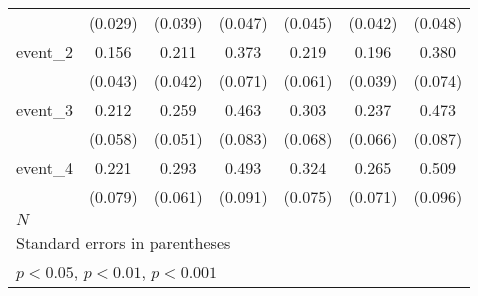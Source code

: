 {\begin{tabular}{l*{6}{c}}
            &     (0.029)         &     (0.039)         &     (0.047)         &     (0.045)         &     (0.042)         &     (0.048)         \\
[1em]
event\_2     &       0.156\sym{***}&       0.211\sym{***}&       0.373\sym{***}&       0.219\sym{***}&       0.196\sym{***}&       0.380\sym{***}\\
            &     (0.043)         &     (0.042)         &     (0.071)         &     (0.061)         &     (0.039)         &     (0.074)         \\
[1em]
event\_3     &       0.212\sym{***}&       0.259\sym{***}&       0.463\sym{***}&       0.303\sym{***}&       0.237\sym{***}&       0.473\sym{***}\\
            &     (0.058)         &     (0.051)         &     (0.083)         &     (0.068)         &     (0.066)         &     (0.087)         \\
[1em]
event\_4     &       0.221\sym{**} &       0.293\sym{***}&       0.493\sym{***}&       0.324\sym{***}&       0.265\sym{***}&       0.509\sym{***}\\
            &     (0.079)         &     (0.061)         &     (0.091)         &     (0.075)         &     (0.071)         &     (0.096)         \\
\hline
\(N\)       &                     &                     &                     &                     &                     &                     \\
\hline\hline
\multicolumn{7}{l}{\footnotesize Standard errors in parentheses}\\
\multicolumn{7}{l}{\footnotesize \sym{*} \(p<0.05\), \sym{**} \(p<0.01\), \sym{***} \(p<0.001\)}\\
\end{tabular}
}
